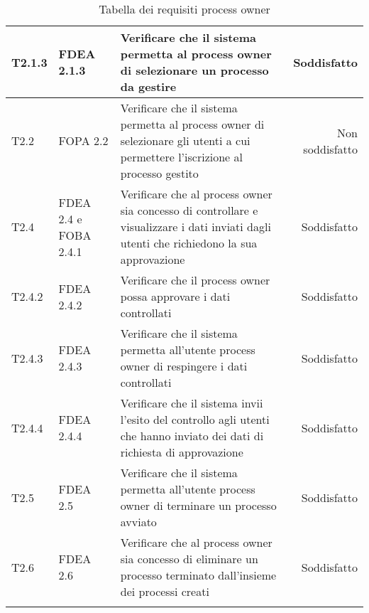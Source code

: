 \begin{longtable}{llXr}
\midrule
T2.1.3&FDEA 2.1.3&Verificare che il sistema permetta al process owner di selezionare un processo da gestire&Soddisfatto\\
\midrule
T2.2&FOPA 2.2&Verificare che il sistema permetta al process owner di selezionare gli utenti a cui permettere l'iscrizione al processo gestito&Non soddisfatto\\
\midrule
T2.4&FDEA 2.4 e FOBA 2.4.1&Verificare che al process owner sia concesso di controllare e visualizzare i dati inviati dagli utenti che richiedono la sua approvazione& Soddisfatto\\
\midrule
T2.4.2&FDEA 2.4.2&Verificare che il process owner possa approvare i dati controllati&Soddisfatto\\
\midrule
T2.4.3&FDEA 2.4.3&Verificare che il sistema permetta all'utente process owner di respingere i dati controllati&Soddisfatto\\
\midrule
T2.4.4&FDEA 2.4.4&Verificare che il sistema invii l'esito del controllo agli utenti che hanno inviato dei dati di richiesta di approvazione&Soddisfatto\\
\midrule
T2.5&FDEA 2.5&Verificare che il sistema permetta all'utente process owner di terminare un processo avviato&Soddisfatto\\
\midrule
T2.6&FDEA 2.6&Verificare che al process owner sia concesso di eliminare un processo terminato dall'insieme dei processi creati&Soddisfatto\\ 
\bottomrule
\caption{Tabella dei requisiti process owner}
\end{longtable}